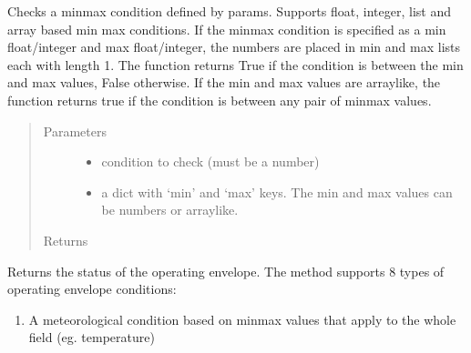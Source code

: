 \documentclass[letterpaper,10pt,english]{sphinxmanual}
\begin{document}
\begin{fulllineitems}
\begin{fulllineitems}
\label{\detokenize{index:feast.DetectionModules.abstract_detection_method.DetectionMethod.check_min_max_condition}}
Checks a min\sphinxhyphen{}max condition defined by params. Supports float, integer, list and array based min max conditions.
If the min\sphinxhyphen{}max condition is specified as a min float/integer and max float/integer, the numbers are placed in
min and max lists each with length 1. The function returns True if the condition is between the min and max
values, False otherwise. If the min and max values are array\sphinxhyphen{}like, the function returns true if the condition is
between any pair of min\sphinxhyphen{}max values.
\begin{quote}\begin{description}
\item[{Parameters}] \leavevmode\begin{itemize}
\item {} 
 \textendash{} condition to check (must be a number)

\item {} 
 \textendash{} a dict with ‘min’ and ‘max’ keys. The min and max values can be numbers or array\sphinxhyphen{}like.

\end{itemize}

\item[{Returns}] \leavevmode


\end{description}\end{quote}

\end{fulllineitems}


\begin{fulllineitems}
\label{\detokenize{index:feast.DetectionModules.abstract_detection_method.DetectionMethod.check_op_envelope}}
Returns the status of the operating envelope. The method supports 8 types of operating envelope conditions:
\begin{enumerate}
%
\item {} 
A meteorological condition based on min\sphinxhyphen{}max values that apply to the whole field (eg. temperature)


\end{enumerate}
\end{fulllineitems}
\end{fulllineitems}
\end{document}
